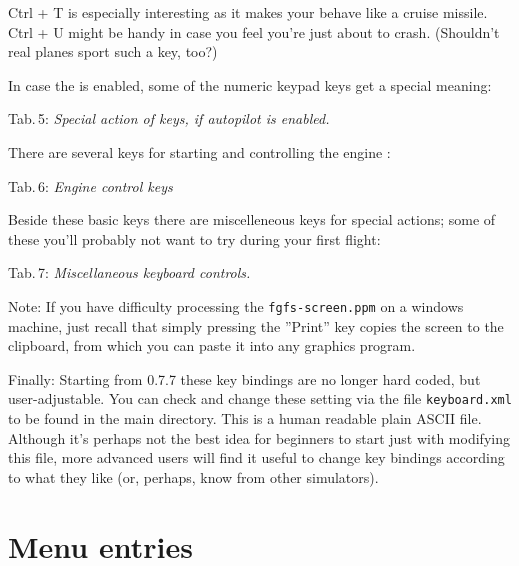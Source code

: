 \noindent Ctrl + T is especially interesting as it makes your  behave
like a cruise missile. Ctrl + U might be handy in case you feel you're just about to
crash. (Shouldn't real planes sport such a key, too?)

In case the  is enabled, some of the numeric keypad keys get a special
meaning:

\noindent
 Tab.\,5: \textit{Special action of keys, if autopilot is enabled.}
\medskip

\centerline{}
\medskip

There are several keys for starting and controlling the engine :

\noindent
 Tab.\,6: \textit{Engine control keys}
\medskip

\centerline{}
\medskip

Beside these basic keys there are miscelleneous keys for special actions; some of these you'll probably not want to try during your first flight:

\noindent Tab.\,7: \textit{Miscellaneous keyboard controls.}
\medskip

\centerline{}
\medskip

\noindent
 Note: If you have difficulty processing the  \texttt{fgfs-screen.ppm}
on a windows machine, just recall that simply pressing the ''Print'' key copies the
screen to the clipboard, from which you can paste it into any graphics program.

Finally: Starting from \FlightGear{} 0.7.7  these key bindings are no longer hard coded, but user-adjustable. You can check and change these setting via the file \texttt{keyboard.xml} to
be found in the main \FlightGear{} directory. This is a human readable plain ASCII file.
Although it's perhaps not the best idea for beginners to start just with modifying this
file, more advanced users will find it useful to change key bindings according to what
they like (or, perhaps, know from other simulators).

\section{Menu entries}

